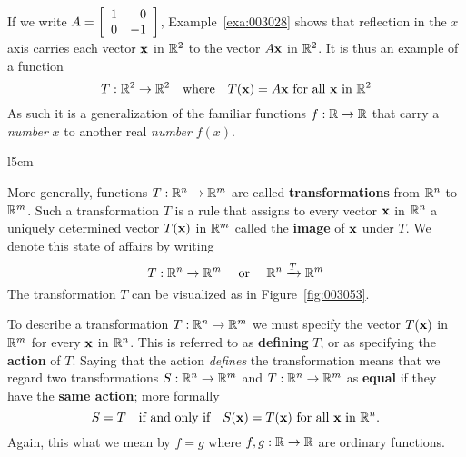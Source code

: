 If we write $A = \left[ \begin{array}{rr}
1 & 0 \\
0 & -1
\end{array} \right]$, Example~\ref{exa:003028} shows that reflection in the $x$ axis carries each vector $\textbf{x}$ in $\mathbb{R}^2$ to the vector $A\textbf{x}$ in $\mathbb{R}^2$. It is thus an example of a function
\begin{equation*}
T : \mathbb{R}^{2} \to \mathbb{R}^{2} \quad \mbox{where} \quad T(\textbf{x}) = A\textbf{x} \mbox{ for all } \textbf{x} \mbox{ in } \mathbb{R}^{2}
\end{equation*}
As such it is a generalization of the familiar functions $f : \mathbb{R} \to \mathbb{R}$ that carry a \textit{number} $x$ to another real \textit{number} $f(x)$.

\newpage
\begin{wrapfigure}{l}{5cm}
	\centering
	
	\caption{\label{fig:003053}}
\end{wrapfigure}
More generally, functions $T : \mathbb{R}^n \to \mathbb{R}^m$ are called \textbf{transformations} from $\mathbb{R}^n$ to $\mathbb{R}^m$. Such a transformation $T$ is a rule that assigns to every vector $\textbf{x}$ in $\mathbb{R}^n$ a uniquely determined vector $T(\textbf{x})$ in $\mathbb{R}^m$ called the \textbf{image} of $\textbf{x}$ under $T$. We denote this state of affairs by writing
\begin{equation*}
T : \mathbb{R}^{n} \to \mathbb{R}^{m} \quad \mbox{ or } \quad \mathbb{R}^{n} \xrightarrow{T} \mathbb{R}^{m}
\end{equation*}
The transformation $T$ can be visualized as in Figure~\ref{fig:003053}.



To describe a transformation $T : \mathbb{R}^n \to \mathbb{R}^m$ we must specify the vector $T(\textbf{x})$ in $\mathbb{R}^m$ for every $\textbf{x}$ in $\mathbb{R}^n$. This is referred to as \textbf{defining} $T$, or as specifying the \textbf{action} of $T$. Saying that the action \textit{defines} the transformation means that we regard two transformations $S : \mathbb{R}^n \to \mathbb{R}^m$  and $T : \mathbb{R}^n  \to \mathbb{R}^m$  as \textbf{equal} if they have the \textbf{same action}; more formally
\begin{equation*}
S = T \quad \mbox{if and only if} \quad S(\textbf{x}) = T(\textbf{x}) \mbox{ for all } \textbf{x} \mbox{ in } \mathbb{R}^{n}.
\end{equation*}
Again, this what we mean by $f = g$ where $f, g : \mathbb{R} \to \mathbb{R}$ are ordinary functions.


